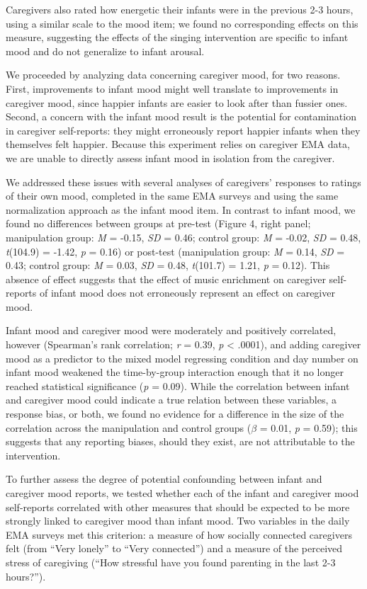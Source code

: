 \documentclass[
]{article}
\begin{document}
Caregivers also rated how energetic their infants were in the previous
2-3 hours, using a similar scale to the mood item; we found no
corresponding effects on this measure, suggesting the effects of the
singing intervention are specific to infant mood and do not generalize
to infant arousal.

We proceeded by analyzing data concerning caregiver mood, for two
reasons. First, improvements to infant mood might well translate to
improvements in caregiver mood, since happier infants are easier to look
after than fussier ones. Second, a concern with the infant mood result
is the potential for contamination in caregiver self-reports: they might
erroneously report happier infants when they themselves felt happier.
Because this experiment relies on caregiver EMA data, we are unable to
directly assess infant mood in isolation from the caregiver.

We addressed these issues with several analyses of caregivers' responses
to ratings of their own mood, completed in the same EMA surveys and
using the same normalization approach as the infant mood item. In
contrast to infant mood, we found no differences between groups at
pre-test (Figure 4, right panel; manipulation group: \emph{M} = -0.15,
\emph{SD} = 0.46; control group: \emph{M} = -0.02, \emph{SD} = 0.48,
\emph{t}(104.9) = -1.42, \emph{p} = 0.16) or post-test (manipulation
group: \emph{M} = 0.14, \emph{SD} = 0.43; control group: \emph{M} =
0.03, \emph{SD} = 0.48, \emph{t}(101.7) = 1.21, \emph{p} = 0.12). This
absence of effect suggests that the effect of music enrichment on
caregiver self-reports of infant mood does not erroneously represent an
effect on caregiver mood.

Infant mood and caregiver mood were moderately and positively
correlated, however (Spearman's rank correlation; \emph{r} = 0.39,
\emph{p} \textless{} .0001), and adding caregiver mood as a predictor to
the mixed model regressing condition and day number on infant mood
weakened the time-by-group interaction enough that it no longer reached
statistical significance (\emph{p} = 0.09). While the correlation
between infant and caregiver mood could indicate a true relation between
these variables, a response bias, or both, we found no evidence for a
difference in the size of the correlation across the manipulation and
control groups (\(\beta\) = 0.01, \emph{p} = 0.59); this suggests that
any reporting biases, should they exist, are not attributable to the
intervention.

To further assess the degree of potential confounding between infant and
caregiver mood reports, we tested whether each of the infant and
caregiver mood self-reports correlated with other measures that should
be expected to be more strongly linked to caregiver mood than infant
mood. Two variables in the daily EMA surveys met this criterion: a
measure of how socially connected caregivers felt (from ``Very lonely''
to ``Very connected'') and a measure of the perceived stress of
caregiving (``How stressful have you found parenting in the last 2-3
hours?'').
\end{document}
